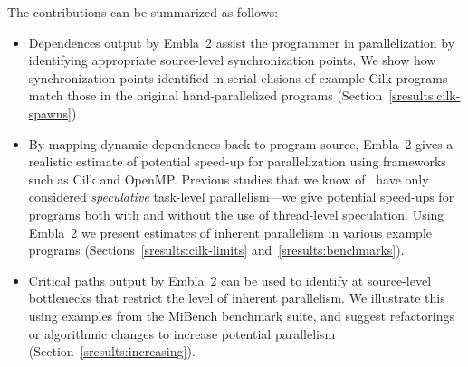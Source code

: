 The contributions can be summarized as follows:
\begin{itemize}
\item
Dependences output by Embla~2 assist the programmer in 
parallelization by identifying
appropriate source-level synchronization points. We show how synchronization
points identified in serial elisions of example Cilk programs
match those in the original hand-parallelized programs (Section~\ref{sresults:cilk-spawns}).
\item
By mapping dynamic dependences back to program source,
Embla~2 gives a realistic estimate of potential speed-up for
parallelization using frameworks such as Cilk and OpenMP.
Previous studies that we know of~\cite{Kreaseck00limitsof,warg01limits,oplinger99insearch}
have only considered \emph{speculative}
task-level parallelism---we give potential speed-ups for programs
both with and without the use of thread-level speculation.
Using Embla~2 we present estimates of inherent parallelism in
various example programs (Sections~\ref{sresults:cilk-limits} and~\ref{sresults:benchmarks}).
\item
Critical paths output by Embla~2 can
be used to identify at source-level bottlenecks that restrict the level of
inherent parallelism. We illustrate this using examples
from the MiBench benchmark suite, and suggest refactorings
or algorithmic changes to increase potential parallelism (Section~\ref{sresults:increasing}).
\end{itemize}
